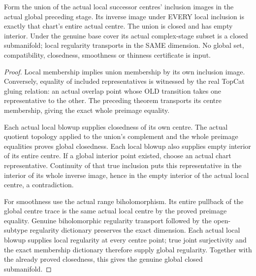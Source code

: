 \begin{theorem}
\label{hir:sharp-actual-curve-global-successor-centre-geometry}
\leanok
Form the union of the actual local successor centres' inclusion images in
the actual global preceding stage. Its inverse image under EVERY local
inclusion is exactly that chart's entire actual centre. The union is
closed and has empty interior. Under the genuine base cover its actual
complex-stage subset is a closed submanifold; local regularity transports
in the SAME dimension. No global set, compatibility, closedness,
smoothness or thinness certificate is input.
\end{theorem}
\begin{proof}
Local membership implies union membership by its own inclusion image.
Conversely, equality of included representatives is witnessed by the real
TopCat gluing relation: an actual overlap point whose OLD transition takes
one representative to the other. The preceding theorem transports its
centre membership, giving the exact whole preimage equality.

Each actual local blowup supplies closedness of its own centre. The actual
quotient topology applied to the union's complement and the whole preimage
equalities proves global closedness. Each local blowup also supplies empty
interior of its entire centre. If a global interior point existed, choose
an actual chart representative. Continuity of that true inclusion puts
this representative in the interior of its whole inverse image, hence in
the empty interior of the actual local centre, a contradiction.

For smoothness use the actual range biholomorphism. Its entire pullback of
the global centre trace is the same actual local centre by the proved
preimage equality. Genuine biholomorphic regularity transport followed by
the open-subtype regularity dictionary preserves the exact dimension.
Each actual local blowup supplies local regularity at every centre point;
true joint surjectivity and the exact membership dictionary therefore
supply global regularity. Together with the already proved closedness,
this gives the genuine global closed submanifold.
\end{proof}


